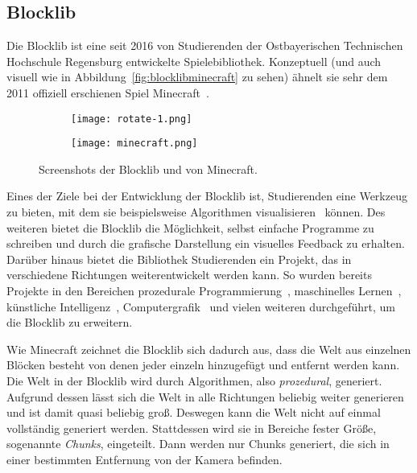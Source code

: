 \subsection{Blocklib}
Die Blocklib ist eine seit 2016 von Studierenden der Ostbayerischen Technischen Hochschule Regensburg entwickelte Spielebibliothek. Konzeptuell (und auch visuell wie in Abbildung~\vref{fig:blocklibminecraft} zu sehen) ähnelt sie sehr dem 2011 offiziell erschienen Spiel Minecraft~\cite{Mojang}.
\begin{figure}[!htbp]
	\begin{subfigure}[b]{.49\textwidth}
		\texttt{[image: rotate-1.png]}
	\end{subfigure}
	\begin{subfigure}[b]{.49\textwidth}
		\texttt{[image: minecraft.png]}
	\end{subfigure}
	\caption{Screenshots der Blocklib und von Minecraft.}\label{fig:blocklibminecraft}
\end{figure}
Eines der Ziele bei der Entwicklung der Blocklib ist, Studierenden eine Werkzeug zu bieten, mit dem sie beispielsweise Algorithmen visualisieren~\cite{Helgert2018} können. Des weiteren bietet die Blocklib die Möglichkeit, selbst einfache Programme zu schreiben und durch die grafische Darstellung ein visuelles Feedback zu erhalten. Darüber hinaus bietet die Bibliothek Studierenden ein Projekt, das in verschiedene Richtungen weiterentwickelt werden kann. So wurden bereits Projekte in den Bereichen prozedurale Programmierung~\cite{Beer2017,Ebbinger2018a,Kalle2018,Sellner2020,Kohler2021}, maschinelles Lernen~\cite{Mayer2021}, künstliche Intelligenz~\cite{Amthor2017,Weidner2018,Bunke2021,Mayer2021}, Computergrafik~\cite{Zink2016,Ebbinger2018,Werner2018} und vielen weiteren durchgeführt, um die Blocklib zu erweitern.

Wie Minecraft zeichnet die Blocklib sich dadurch aus, dass die Welt aus einzelnen Blöcken besteht von denen jeder einzeln hinzugefügt und entfernt werden kann. Die Welt in der Blocklib wird durch Algorithmen, also \emph{prozedural}, generiert. Aufgrund dessen lässt sich die Welt in alle Richtungen beliebig weiter generieren und ist damit quasi beliebig groß. Deswegen kann die Welt nicht auf einmal vollständig generiert werden. Stattdessen wird sie in Bereiche fester Größe, sogenannte \emph{Chunks}, eingeteilt. Dann werden nur Chunks generiert, die sich in einer bestimmten Entfernung von der Kamera befinden.


